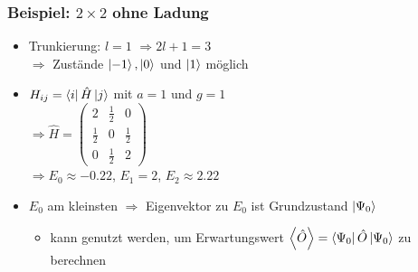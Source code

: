 \documentclass{beamer}
\begin{document}
\begin{frame}
	\frametitle{Beispiel: $2\times2$ ohne Ladung}
	\begin{itemize}
		\item Trunkierung: $l=1$ $\Rightarrow 2l+1=3$\\
		      $\Rightarrow$ Zustände $\ket{-1}, \ket{0}$ und $\ket{1}$ möglich
		\item $H_{ij}=\bra{i}\hat{H}\ket{j}$ mit $a=1$ und $g=1$\vspace{7pt}\\
		      $ \Rightarrow \hat{H}=
			      \begin{pmatrix}
				      2           & \frac{1}{2} & 0           \\
				      \frac{1}{2} & 0           & \frac{1}{2} \\
				      0           & \frac{1}{2} & 2
			      \end{pmatrix}$\vspace{7pt}\\
		      $\Rightarrow E_0\approx-\num{0.22}$, $E_1=\num{2}$, $E_2\approx\num{2.22}$
        \item $E_0$ am kleinsten $\Rightarrow$ Eigenvektor zu $E_0$ ist Grundzustand $\ket{\Psi_0}$
          \begin{itemize}
            \item kann genutzt werden, um Erwartungswert $\Braket{\hat{O}}=\bra{\Psi_0}\hat{O}\ket{\Psi_0}$ zu berechnen
          \end{itemize}
	\end{itemize}
\end{frame}
\end{document}
